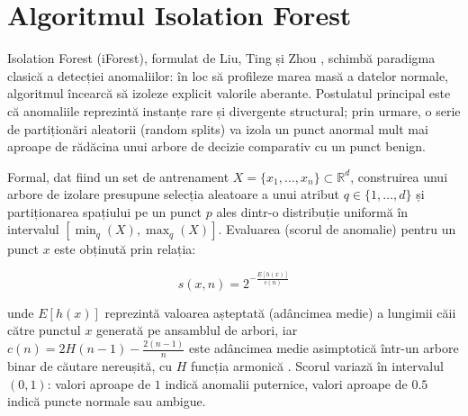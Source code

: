 \section{Algoritmul Isolation Forest}
\label{sec:isolation_forest}

\par Isolation Forest (iForest), formulat de Liu, Ting și Zhou \cite{Liu2008IF, Liu2012IF}, schimbă paradigma clasică a detecției anomaliilor: în loc să profileze marea masă a datelor normale, algoritmul încearcă să izoleze explicit valorile aberante. Postulatul principal este că anomaliile reprezintă instanțe rare și divergente structural; prin urmare, o serie de partiționări aleatorii (random splits) va izola un punct anormal mult mai aproape de rădăcina unui arbore de decizie comparativ cu un punct benign.

\par Formal, dat fiind un set de antrenament $X = \{x_1, \ldots, x_n\} \subset \mathbb{R}^d$, construirea unui arbore de izolare presupune selecția aleatoare a unui atribut $q \in \{1, \ldots, d\}$ și partiționarea spațiului pe un punct $p$ ales dintr-o distribuție uniformă în intervalul $[\min_q(X), \max_q(X)]$. Evaluarea (scorul de anomalie) pentru un punct $x$ este obținută prin relația:

\begin{equation}
    s(x, n) = 2^{-\frac{E[h(x)]}{c(n)}}
    \label{eq:isolation_score}
\end{equation}

\noindent unde $E[h(x)]$ reprezintă valoarea așteptată (adâncimea medie) a lungimii căii către punctul $x$ generată pe ansamblul de arbori, iar $c(n) = 2H(n-1) - \frac{2(n-1)}{n}$ este adâncimea medie asimptotică într-un arbore binar de căutare nereușită, cu $H$ funcția armonică \cite{Liu2012IF}. Scorul variază în intervalul $(0, 1)$: valori aproape de $1$ indică anomalii puternice, valori aproape de $0.5$ indică puncte normale sau ambigue.

